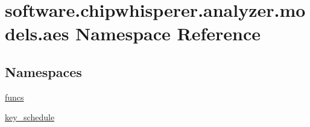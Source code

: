 \hypertarget{namespacesoftware_1_1chipwhisperer_1_1analyzer_1_1models_1_1aes}{}\section{software.\+chipwhisperer.\+analyzer.\+models.\+aes Namespace Reference}
\label{namespacesoftware_1_1chipwhisperer_1_1analyzer_1_1models_1_1aes}
\subsection*{Namespaces}
\begin{DoxyCompactItemize}
\item 
 \hyperlink{namespacesoftware_1_1chipwhisperer_1_1analyzer_1_1models_1_1aes_1_1funcs}{funcs}
\item 
 \hyperlink{namespacesoftware_1_1chipwhisperer_1_1analyzer_1_1models_1_1aes_1_1key__schedule}{key\+\_\+schedule}
\end{DoxyCompactItemize}
